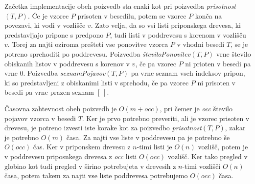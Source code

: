 Začetka implementacije obeh poizvedb sta enaki kot pri poizvedba \textit{prisotnost}$(T,P)$. Če je vzorec $P$ prisoten v besedilu, potem se vzorec $P$ konča na povezavi, ki vodi v vozlišče $v$. Zato velja, da so vsi listi priponskega drevesa, ki predstavljajo pripone s predpono $P$, tudi listi v poddrevesu s korenom v vozlišču $v$. Torej za najti oziroma prešteti vse ponovitve vzorca $P$ v vhodni besedi $T$, se je potreno sprehoditi po poddrevesu. Poizvedba \textit{številoPonovitev}$(T,P)$ vrne število obiskanih listov v poddrevesu s korenov v $v$, če pa vzorec $P$ ni prioten v besedi pa vrne $0$. Poizvedba \textit{seznamPojavov}$(T,P)$ pa vrne seznam vseh indeksov pripon, ki so predstavljeni z obiskanimi listi v sprehodu, če pa vzorec $P$ ni prisoten v besedi pa vrne prazen seznam $[~]$.

Časovna zahtevnost obeh poizvedb je $O(m+\textit{occ})$, pri čemer je \textit{occ} število pojavov vzorca v besedi $T$. Ker je prvo potrebno preveriti, ali je vzorec prisoten v drevesu, je potreno izvesti iste korake kot za poizvedbo \textit{prisotnost}$(T,P)$, zakar je potrebno $O(m)$ časa. Za najti vse liste v poddrevesu pa je potrebno še $O(\textit{occ})$ čas. Ker v priponskem drevesu z $n$-timi listi je $O(n)$ vozlišč, potem je v poddrevesu priposnkega drevesa z \textit{occ} listi $O(\textit{occ})$ vozlišč. Ker tako pregled v globino kot tudi pregled v širino potrebujeta v drevesih z $n$-timi vozlišči $O(n)$ časa, potem takem za najti vse liste poddrevesa potrebujemo $O(\textit{occ})$ časa.

